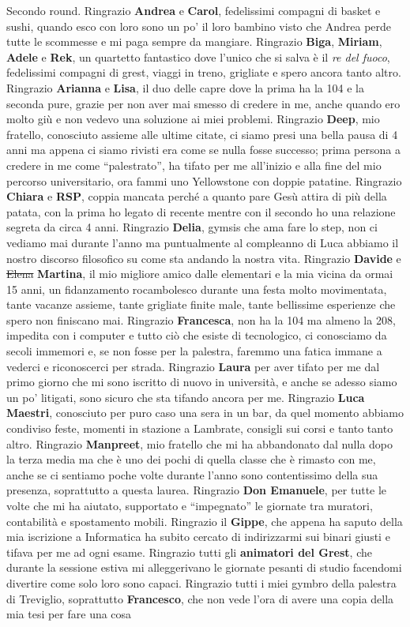 \noindent Secondo round. Ringrazio \textbf{Andrea} e \textbf{Carol}, fedelissimi compagni di basket e sushi, quando esco con loro sono un po' il loro bambino visto che Andrea perde tutte le scommesse e mi paga sempre da mangiare. Ringrazio \textbf{Biga}, \textbf{Miriam}, \textbf{Adele} e \textbf{Rek}, un quartetto fantastico dove l'unico che si salva è il \textit{re del fuoco}, fedelissimi compagni di grest, viaggi in treno, grigliate e spero ancora tanto altro. Ringrazio \textbf{Arianna} e \textbf{Lisa}, il duo delle capre dove la prima ha la 104 e la seconda pure, grazie per non aver mai smesso di credere in me, anche quando ero molto giù e non vedevo una soluzione ai miei problemi. Ringrazio \textbf{Deep}, mio fratello, conosciuto assieme alle ultime citate, ci siamo presi una bella pausa di 4 anni ma appena ci siamo rivisti era come se nulla fosse successo; prima persona a credere in me come ``palestrato'', ha tifato per me all'inizio e alla fine del mio percorso universitario, ora fammi uno Yellowstone con doppie patatine. Ringrazio \textbf{Chiara} e \textbf{RSP}, coppia mancata perché a quanto pare Gesù attira di più della patata, con la prima ho legato di recente mentre con il secondo ho una relazione segreta da circa 4 anni. Ringrazio \textbf{Delia}, gymsis che ama fare lo step, non ci vediamo mai durante l'anno ma puntualmente al compleanno di Luca abbiamo il nostro discorso filosofico su come sta andando la nostra vita. Ringrazio \textbf{Davide} e \st{Elena} \textbf{Martina}, il mio migliore amico dalle elementari e la mia vicina da ormai 15 anni, un fidanzamento rocambolesco durante una festa molto movimentata, tante vacanze assieme, tante grigliate finite male, tante bellissime esperienze che spero non finiscano mai. Ringrazio \textbf{Francesca}, non ha la 104 ma almeno la 208, impedita con i computer e tutto ciò che esiste di tecnologico, ci conosciamo da secoli immemori e, se non fosse per la palestra, faremmo una fatica immane a vederci e riconoscerci per strada. Ringrazio \textbf{Laura} per aver tifato per me dal primo giorno che mi sono iscritto di nuovo in università, e anche se adesso siamo un po' litigati, sono sicuro che sta tifando ancora per me. Ringrazio \textbf{Luca Maestri}, conosciuto per puro caso una sera in un bar, da quel momento abbiamo condiviso feste, momenti in stazione a Lambrate, consigli sui corsi e tanto tanto altro. Ringrazio \textbf{Manpreet}, mio fratello che mi ha abbandonato dal nulla dopo la terza media ma che è uno dei pochi di quella classe che è rimasto con me, anche se ci sentiamo poche volte durante l'anno sono contentissimo della sua presenza, soprattutto a questa laurea. Ringrazio \textbf{Don Emanuele}, per tutte le volte che mi ha aiutato, supportato e ``impegnato'' le giornate tra muratori, contabilità e spostamento mobili. Ringrazio il \textbf{Gippe}, che appena ha saputo della mia iscrizione a Informatica ha subito cercato di indirizzarmi sui binari giusti e tifava per me ad ogni esame. Ringrazio tutti gli \textbf{animatori del Grest}, che durante la sessione estiva mi alleggerivano le giornate pesanti di studio facendomi divertire come solo loro sono capaci. Ringrazio tutti i miei gymbro della palestra di Treviglio, soprattutto \textbf{Francesco}, che non vede l'ora di avere una copia della mia tesi per fare una cosa 